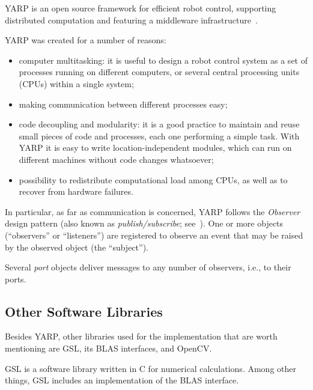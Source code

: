 \ac{YARP} is an open source framework for efficient robot control, supporting distributed computation and featuring a middleware infrastructure~\cite{link:yarp, metta:yarp}.

\ac{YARP} was created for a number of reasons:
\begin{itemize}
\item computer multitasking: it is useful to design a robot control system as a set of processes running on different computers, or several central processing units (CPUs) within a single system;

\item making communication between different processes easy;

\item code decoupling and modularity: it is a good practice to maintain and reuse small pieces of code and processes, each one performing a simple task. With \ac{YARP} it is easy to write location-independent modules, which can run on different machines without code changes whatsoever;

\item possibility to redistribute computational load among CPUs, as well as to recover from hardware failures.
\end{itemize}

In particular, as far as communication is concerned, \ac{YARP} follows the \emph{Observer} design pattern (also known as \emph{publish/subscribe}; see~\cite{gamma}). One or more objects (``observers'' or ``listeners'') are registered to observe an event that may be raised by the observed object (the ``subject'').

Several \emph{port} objects deliver messages to any number of observers, i.e., to their ports.

\subsection{Other Software Libraries}

Besides \ac{YARP}, other libraries used for the implementation that are worth mentioning are \ac{GSL}, its \ac{BLAS} interfaces, and OpenCV.

\bigskip

\ac{GSL} is a software library written in C for numerical calculations. Among other things, \ac{GSL} includes an implementation of the \ac{BLAS} interface.

